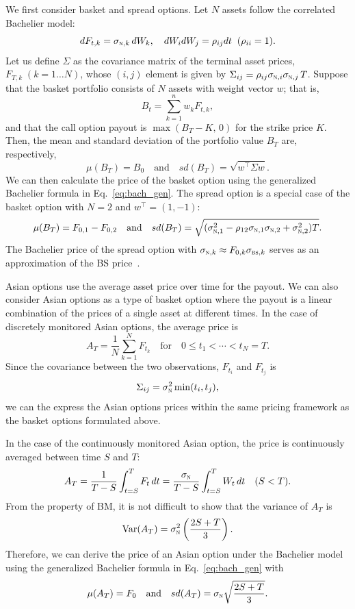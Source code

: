 \documentclass[a4paper,review]{elsarticle}
\newcommand{\qtext}[2][\quad]{#1\text{#2}#1}
\newcommand{\sigman}{\sigma_\textsc{n}}
\newcommand{\norm}{\textsc{n}}
\newcommand{\bs}{\textsc{bs}}
\begin{document}
We first consider basket and spread options. Let $N$ assets follow the correlated Bachelier model:
$$ dF_{t,k} = \sigma_{\norm, k}\, dW_k, \quad dW_i dW_j = \rho_{ij} dt \;\; (\rho_{ii}=1).$$
Let us define $\Sigma$ as the covariance matrix of the terminal asset prices, $F_{T,k}\; (k = 1\ldots N)$, whose $(i,j)$ element is given by $\Sigma_{ij} = \rho_{ij} \sigma_{\norm, i} \sigma_{\norm, j}\, T$.
Suppose that the basket portfolio consists of $N$ assets with weight vector $w$; that is,
$$ B_t = \sum_{k=1}^{n} w_k F_{t,k}, $$
and that the call option payout is $\max(B_T - K,\, 0)$ for the strike price $K$. Then, the mean and standard deviation of the portfolio value $B_T$ are, respectively,
$$ \mu(B_T) = B_0 \qtext{and} sd(B_T) = \sqrt{w^\top \Sigma w}.
$$
We can then calculate the price of the basket option using the generalized Bachelier formula in Eq.~\eqref{eq:bach_gen}. The spread option is a special case of the basket option with $N=2$ and $w^\top=(1,-1)$:
$$ \mu(B_T) = F_{0,1} - F_{0,2} \qtext{and} sd(B_T) = \sqrt{(\sigma^2_{\norm,1} - \rho_{12}\sigma_{\norm,1}\sigma_{\norm,2} + \sigma^2_{\norm,2})T}.
$$
The Bachelier price of the spread option with $\sigma_{\norm, k} \approx F_{0,k} \sigma_{\bs, k}$ serves as an approximation of the BS price~\citep{poitras1998spread}.

Asian options use the average asset price over time for the payout. We can also consider Asian options as a type of basket option where the payout is a linear combination of the prices of a single asset at different times. In the case of discretely monitored Asian options, the average price is
$$ A_T = \frac{1}{N}\sum_{k=1}^N F_{t_k} \qtext{for} 0\le t_1 < \cdots < t_N = T.$$
Since the covariance between the two observations, $F_{t_i}$ and $F_{t_j}$ is 
$$ \Sigma_{ij} = \sigman^2 \min(t_i, t_j), $$
we can the express the Asian options prices within the same pricing framework as the basket options formulated above.

In the case of the continuously monitored Asian option, the price is continuously averaged between time $S$ and $T$:
$$A_T = \frac{1}{T-S}\int_{t=S}^{T} F_t\, dt = \frac{\sigman}{T-S} \int_{t=S}^{T} W_t\, dt \quad (S<T).$$
From the property of BM, it is not difficult to show that the variance of $A_T$ is
$$ \text{Var} (A_T) = \sigman^2 \left(\frac{2S + T}{3}\right). 
$$
Therefore, we can derive the price of an Asian option under the Bachelier model using the generalized Bachelier formula in Eq.~\eqref{eq:bach_gen} with 
$$ \mu(A_T) = F_0 \qtext{and} sd(A_T) = \sigman \sqrt{\frac{2S + T}{3}}.
$$
\end{document}
